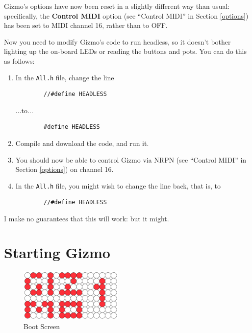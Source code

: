 \documentclass{article}
\begin{document}
Gizmo's options have now been reset in a slightly different way than usual: specifically, the {\bf Control MIDI} option (see ``Control MIDI'' in Section \ref{options}) has been set to MIDI channel 16, rather than to OFF.

Now you need to modify Gizmo's code to run headless, so it doesn't bother lighting up the on-board LEDs or reading the buttons and pots.   You can do this as follows:

\begin{enumerate}
\item In the \texttt{All.h} file, change the line 
\begin{verbatim}
        //#define HEADLESS
\end{verbatim}
...to...
\begin{verbatim}
        #define HEADLESS
\end{verbatim}
\item Compile and download the code, and run it.
\item You should now be able to control Gizmo via NRPN (see ``Control MIDI'' in Section \ref{options}) on channel 16.
\item In the \texttt{All.h} file, you might wish to change the line back, that is, to 
\begin{verbatim}
        //#define HEADLESS
\end{verbatim}

\end{enumerate}

I make no guarantees that this will work: but it might.

\clearpage
\section{Starting Gizmo}

\begin{figure}
\vspace{-1.5em}\includegraphics[width=2in]{Gizmo1.pdf}
\vspace{-2em}\caption{\small Boot Screen}\vspace{-2em}
\label{BootScreen}
\end{figure}
\end{document}
